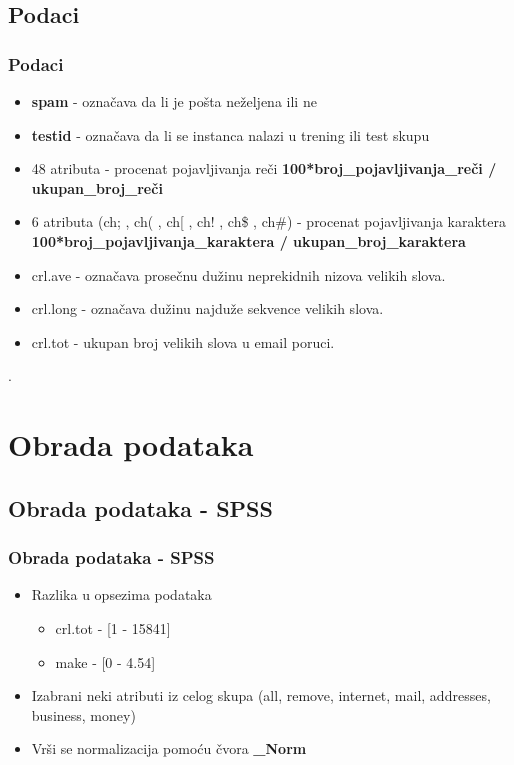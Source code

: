 \documentclass{beamer}
\begin{document}
\subsection*{Podaci}
\begin{frame}[fragile]
\frametitle{Podaci}
\begin{itemize}
    \item \textbf{spam} - označava da li je pošta neželjena ili ne
    \item \textbf{testid} - označava da li se instanca nalazi u trening ili test skupu
    \item 48 atributa - procenat pojavljivanja reči
\textbf{100*broj\_pojavljivanja\_reči / ukupan\_broj\_reči}
	\item 6 atributa (ch; , ch( , ch[ , ch! , ch\$ , ch\#) - procenat pojavljivanja karaktera
\textbf{ 100*broj\_pojavljivanja\_karaktera / ukupan\_broj\_karaktera}
	\item crl.ave - označava prosečnu dužinu neprekidnih nizova velikih slova.
	\item crl.long - označava dužinu najduže sekvence velikih slova.
	\item crl.tot - ukupan broj velikih slova u email poruci.   
\end{itemize}.

\end{frame}

\section{Obrada podataka}
\subsection*{Obrada podataka - SPSS}
\begin{frame}[fragile]
\frametitle{Obrada podataka - SPSS}

\begin{itemize}
 \item Razlika u opsezima podataka
 	\begin{itemize}
 	\item crl.tot - [1 - 15841]
 	\item make - [0 - 4.54]
 	\end{itemize}
 \item Izabrani neki atributi iz celog skupa (all, remove, internet, mail, addresses, business, money)
 \item Vrši se normalizacija pomoću čvora \textbf{\_Norm}
\end{itemize}
\end{frame}
\end{document}
